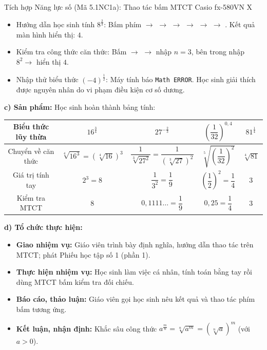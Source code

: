 \documentclass[12pt, a4paper]{article}
\begin{document}
\begin{aibox}{Tích hợp Năng lực số (Mã 5.1NC1a): Thao tác bấm MTCT Casio fx-580VN X}
\begin{itemize}[leftmargin=0.6cm]
    \item Hướng dẫn học sinh tính $8^{\frac{2}{3}}$: Bấm phím  $\to$  $\to$ \fbox{$\dfrac{\blacksquare}{\blacksquare}$} $\to$  $\to$ \fbox{$\blacktriangledown$} $\to$  $\to$ \fbox{$=$}. Kết quả màn hình hiển thị: $4$.
    \item Kiểm tra công thức căn thức: Bấm  $\to$ \fbox{$\sqrt[\blacksquare]{\blacksquare}$} $\to$ nhập $n=3$, bên trong nhập $8^2 \to$ hiển thị $4$.
    \item Nhập thử biểu thức $(-4)^{\frac{1}{2}}$: Máy tính báo \texttt{Math ERROR}. Học sinh giải thích được nguyên nhân do vi phạm điều kiện cơ số dương.
\end{itemize}
\end{aibox}

\noindent \textbf{c) Sản phẩm:}
Học sinh hoàn thành bảng tính:
\begin{center}
\begin{tabular}{|c|c|c|c|c|}
    \hline
    Biểu thức lũy thừa & $16^{\frac{3}{4}}$ & $27^{-\frac{2}{3}}$ & $\left(\dfrac{1}{32}\right)^{0{,}4}$ & $81^{\frac{1}{4}}$ \\ \hline
    Chuyển về căn thức & $\sqrt[4]{16^3} = (\sqrt[4]{16})^3$ & $\dfrac{1}{\sqrt[3]{27^2}} = \dfrac{1}{(\sqrt[3]{27})^2}$ & $\sqrt[5]{\left(\dfrac{1}{32}\right)^2}$ & $\sqrt[4]{81}$ \\ \hline
    Giá trị tính tay & $2^3 = 8$ & $\dfrac{1}{3^2} = \dfrac{1}{9}$ & $\left(\dfrac{1}{2}\right)^2 = \dfrac{1}{4}$ & $3$ \\ \hline
    Kiểm tra MTCT & $8$ & $0{,}1111\dots = \dfrac{1}{9}$ & $0{,}25 = \dfrac{1}{4}$ & $3$ \\ \hline
\end{tabular}
\end{center}

\noindent \textbf{d) Tổ chức thực hiện:}
\begin{itemize}[leftmargin=0.6cm]
    \item \textbf{Giao nhiệm vụ:} Giáo viên trình bày định nghĩa, hướng dẫn thao tác trên MTCT; phát Phiếu học tập số 1 (phần 1).
    \item \textbf{Thực hiện nhiệm vụ:} Học sinh làm việc cá nhân, tính toán bằng tay rồi dùng MTCT bấm kiểm tra đối chiếu.
    \item \textbf{Báo cáo, thảo luận:} Giáo viên gọi học sinh nêu kết quả và thao tác phím bấm tương ứng.
    \item \textbf{Kết luận, nhận định:} Khắc sâu công thức $a^{\frac{m}{n}} = \sqrt[n]{a^m} = (\sqrt[n]{a})^m$ (với $a > 0$).
\end{itemize}
\end{document}
